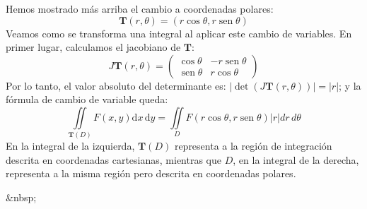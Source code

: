 \begin{ejemplo}
Hemos mostrado más arriba el cambio a coordenadas polares:
\[
\boldsymbol{T}(r,\theta) = (r\cos\theta,r\operatorname{sen}\theta)
\]
Veamos como se transforma una integral al aplicar este cambio de variables.
En primer lugar, calculamos el jacobiano de $\boldsymbol{T}$:
\[
J\boldsymbol{T}(r,\theta)=\left(\begin{array}{cc}
\cos\theta & -r\operatorname{sen}\theta\\
\operatorname{sen}\theta & r\cos\theta
\end{array}
\right)
\]
Por lo tanto, el valor absoluto del determinante es: $|\det(J\boldsymbol{T}(r,\theta))| = |r|$;
y la fórmula de cambio de variable queda:
\[
\iint\limits_{\boldsymbol{T}(\mathit D)} F(x,y)\mathrm dx\,\mathrm dy = \iint\limits_{\mathit D} F(r\cos\theta,r\operatorname{sen}\theta)|r|dr\,d\theta
\]
En la integral de la izquierda, $\boldsymbol{T}(\mathit D)$ representa a la región de integración descrita en coordenadas cartesianas, mientras que $\mathit D$, en la integral de la derecha, representa a la misma región pero descrita en coordenadas polares.\fej
\end{ejemplo}
\begin{rawhtml}
&nbsp;
\end{rawhtml}
